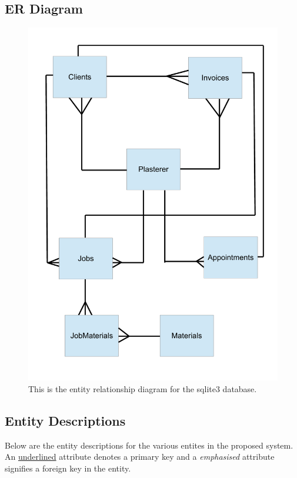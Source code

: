 \subsection{ER Diagram}

\begin{figure}[H]
    \includegraphics[width=\textwidth]{./Analysis/images/ERDiagram.pdf}
    \caption{This is the entity relationship diagram for the sqlite3 database.} \label{fig:Entity_Relationship_Diagram}
\end{figure}


\subsection{Entity Descriptions}

\begin{flushleft}

Below are the entity descriptions for the various entites in the proposed system. An \underline{underlined} attribute denotes a primary key and a \emph{emphasised}	attribute signifies a foreign key in the entity.

\end{flushleft}




